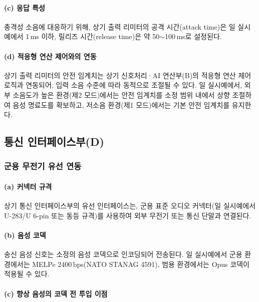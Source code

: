 \documentclass{article}
\begin{document}
\paragraph{(c) 응답 특성}

충격성 소음에 대응하기 위해, 상기 출력 리미터의 공격 시간(attack time)은 일 실시예에서 1\,ms 이하, 릴리즈 시간(release time)은 약 50$\sim$100\,ms로 설정된다.

\paragraph{(d) 적응형 연산 제어와의 연동}

상기 출력 리미터의 안전 임계치는 상기 신호처리·AI 연산부(B)의 적응형 연산 제어 로직과 연동되어, 입력 소음 수준에 따라 동적으로 조절될 수 있다. 일 실시예에서, 외부 소음도가 높은 환경(제2 모드)에서는 안전 임계치를 소정 범위 내에서 상향 조절하여 음성 명료도를 확보하고, 저소음 환경(제1 모드)에서는 기본 안전 임계치를 유지한다.

\subsection{통신 인터페이스부(D)}

\subsubsection{군용 무전기 유선 연동}

\paragraph{(a) 커넥터 규격}

상기 통신 인터페이스부의 유선 인터페이스는, 군용 표준 오디오 커넥터(일 실시예에서 U-283/U 6-pin 또는 동등 규격)를 사용하여 외부 무전기 또는 통신 단말과 연결된다.

\paragraph{(b) 음성 코덱}

송신 음성 신호는 소정의 음성 코덱으로 인코딩되어 전송된다. 일 실시예에서 군용 환경에서는 MELPe 2400\,bps(NATO STANAG 4591), 범용 환경에서는 Opus 코덱이 적용될 수 있다.

\paragraph{(c) 향상 음성의 코덱 전 투입 이점}
\end{document}
